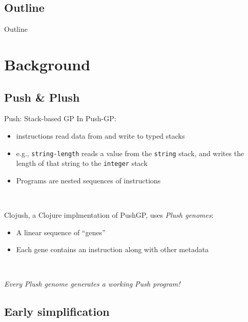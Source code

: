 \documentclass{beamer}
\begin{document}
\subsection*{Outline}

\begin{frame}{Outline}
  \tableofcontents[hideallsubsections]
\end{frame}


\section{Background}

\subsection{Push \& Plush}

\begin{frame}{Push: Stack-based GP}
In Push-GP:
\begin{itemize}
	\item instructions read data from and write to typed stacks
	\item e.g., \texttt{string-length} reads a value from the \texttt{string} stack, and writes the length of that string to the \texttt{integer} stack
	\item Programs are nested sequences of instructions
\end{itemize}

~

Clojush, a Clojure implmentation of PushGP, uses \emph{Plush genomes}:
\begin{itemize}
	\item A linear sequence of ``genes''
	\item Each gene contains an instruction along with other metadata
\end{itemize}

~

\emph{Every Plush genome generates a working Push program!}

\end{frame}

\subsection{Early simplification}
\end{document}
